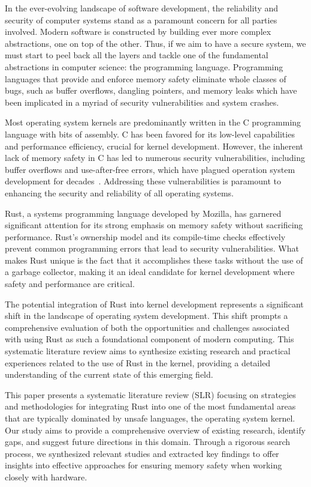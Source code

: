 \documentclass[sigconf,review,anonymous]{acmart}
\begin{document}
In the ever-evolving landscape of software development, the reliability and security of computer
systems stand as a paramount concern for all parties involved. Modern software is constructed by
building ever more complex abstractions, one on top of the other. Thus, if we aim to have a secure
system, we must start to peel back all the layers and tackle one of the fundamental abstractions in
computer science: the programming language. Programming languages that provide and enforce memory
safety eliminate whole classes of bugs, such as buffer overflows, dangling pointers, and memory leaks
which have been implicated in a myriad of security vulnerabilities and system crashes.

Most operating system kernels are predominantly written in the C programming language with bits of
assembly. C has been favored for its low-level capabilities and performance efficiency, crucial for
kernel development. However, the inherent lack of memory safety in C has led to numerous security
vulnerabilities, including buffer overflows and use-after-free errors, which have plagued operation
system development for decades~\cite{noauthor_undated-bf}. Addressing these vulnerabilities is
paramount to enhancing the security and reliability of all operating systems.

Rust, a systems programming language developed by Mozilla, has garnered significant attention for
its strong emphasis on memory safety without sacrificing performance. Rust's ownership model and its
compile-time checks effectively prevent common programming errors that lead to security
vulnerabilities. What makes Rust unique is the fact that it accomplishes these tasks without the use
of a garbage collector, making it an ideal candidate for kernel development where safety and
performance are critical.

The potential integration of Rust into kernel development represents a significant shift in the
landscape of operating system development. This shift prompts a comprehensive evaluation of both the
opportunities and challenges associated with using Rust as such a foundational component of modern
computing. This systematic literature review aims to synthesize existing research and practical
experiences related to the use of Rust in the kernel, providing a detailed understanding of
the current state of this emerging field.

This paper presents a systematic literature review (SLR) focusing on strategies and methodologies
for integrating Rust into one of the most fundamental areas that are typically dominated by unsafe
languages, the operating system kernel. Our study aims to provide a comprehensive overview of
existing research, identify gaps, and suggest future directions in this domain. Through a rigorous
search process, we synthesized relevant studies and extracted key findings to offer insights into
effective approaches for ensuring memory safety when working closely with hardware.
\end{document}
